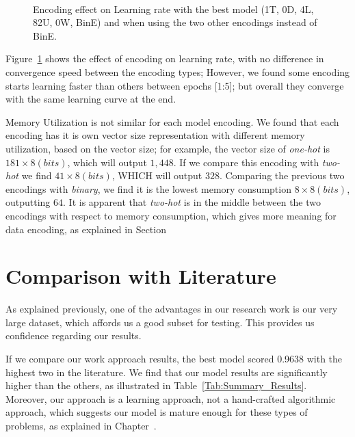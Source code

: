 \begin{figure}[!t]
 \centering
 \begin{tikzpicture}
 
 \end{tikzpicture}
 \caption{Encoding effect on Learning rate with the best model (1T, 0D, 4L, 82U, 0W, BinE) and when using the two other encodings instead of BinE.}~\label{Fig:Convergence_Memory}%
\end{figure}


Figure~\ref{Fig:Convergence_Memory} shows the effect of encoding on learning rate, with no difference in convergence speed between the encoding types; However, we found some encoding starts learning faster than others between epochs [1:5]; but overall they converge with the same learning curve at the end.

Memory Utilization is not similar for each model encoding. We found that each encoding has it is own vector size representation with different memory utilization, based on the vector size; for example, the vector size of \textit{one-hot} is $181 \times 8(bits)$, which will output $1,448$. If we compare this encoding with \textit{two-hot} we find $41 \times 8(bits)$, WHICH will output $328$. Comparing the previous two encodings with \textit{binary}, we find it is the lowest memory consumption $8 \times 8(bits)$, outputting $64$. It is apparent that \textit{two-hot} is in the middle between the two encodings with respect to memory consumption, which gives more meaning for data encoding, as explained in Section~

\section{Comparison with Literature}
As explained previously, one of the advantages in our research work is our very large dataset, which affords us a good subset for testing. This provides us confidence regarding our results.

If we compare our work approach results, the best model scored 0.9638 with the highest two in the literature. We find that our model results are significantly higher than the others, as illustrated in Table~\ref{Tab:Summary_Results}. Moreover, our approach is a learning approach, not a hand-crafted algorithmic approach, which suggests our model is mature enough for these types of problems, as explained in Chapter~.


